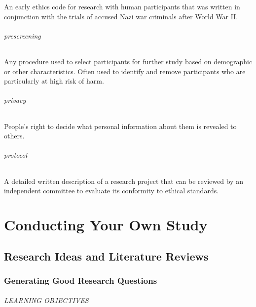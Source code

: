 \documentclass[
]{krantz}
\begin{document}
An early ethics code for research with human participants that was written in conjunction with the trials of accused Nazi war criminals after World War II.

\paragraph*{prescreening}\label{prescreening}

Any procedure used to select participants for further study based on demographic or other characteristics. Often used to identify and remove participants who are particularly at high risk of harm.

\paragraph*{privacy}\label{privacy}

People's right to decide what personal information about them is revealed to others.

\paragraph*{protocol}\label{protocol}

A detailed written description of a research project that can be reviewed by an independent committee to evaluate its conformity to ethical standards.

\part*{Conducting Your Own Study}\label{part-conducting-your-own-study}


\chapter{Research Ideas and Literature Reviews}\label{research-ideas-and-literature-reviews}

\section{Generating Good Research Questions}\label{generating-good-research-questions}

\paragraph*{LEARNING OBJECTIVES}\label{learning-objectives-25}
\end{document}
